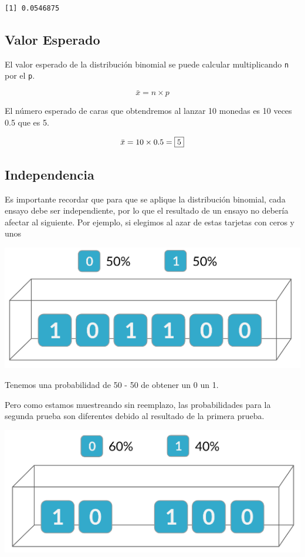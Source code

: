\documentclass[
  letterpaper,
  DIV=11,
  numbers=noendperiod]{scrreprt}
\begin{document}
\begin{verbatim}
[1] 0.0546875
\end{verbatim}

\hypertarget{valor-esperado-1}{%
\subsection{Valor Esperado}\label{valor-esperado-1}}

El valor esperado de la distribución binomial se puede calcular
multiplicando \texttt{n} por el \texttt{p}.

\[
\bar{x}= n\times p
\]

El número esperado de caras que obtendremos al lanzar 10 monedas es 10
veces 0.5 que es 5.

\[
\bar{x} = 10\times 0.5 = \fbox{5}
\]

\hypertarget{independencia}{%
\subsection{Independencia}\label{independencia}}

Es importante recordar que para que se aplique la distribución binomial,
cada ensayo debe ser independiente, por lo que el resultado de un ensayo
no debería afectar al siguiente. Por ejemplo, si elegimos al azar de
estas tarjetas con ceros y unos

\includegraphics{fig44.png}

Tenemos una probabilidad de 50 - 50 de obtener un 0 un 1.

Pero como estamos muestreando sin reemplazo, las probabilidades para la
segunda prueba son diferentes debido al resultado de la primera prueba.

\includegraphics{fig45.png}
\end{document}
